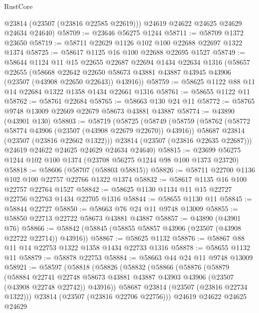 \begin{lexlean}{RustCore}
\begin{coremodule}
        @23814
        (@23507 (@23816 @22585 @22619)))
      @24619
      @24622
      @24625
      @24629
      @24634
      @24640)
@58709 := @23646 @56275 @1244
@58711 := @58709 @1372 @23650
@58719 := @58711 @22629 @1126 @102 @100 @22688 @22697 @1322 @1374
@58725 := @58617 @1125 @16 @100 @22688 @22695 @1527
@58749 := @58644
    @1124
    @11
    @15
    @22655
    @22687
    @22694
    @1434
    @22634
    @1316
    (@58657
      @22655
      (@58668
        @22642
        @22650
        @58673
        @43881
        @43887
        @43945
        @43906
        (@23507 (@43908 @22650 @22643))
        @43916))
@58759 := @58625 @1122 @88 @11 @14 @22684 @1322 @1358 @1434 @22661 @1316
@58761 := @58655 @1122 @11
@58762 := @58761 @22684
@58765 := @58663 @130 @24 @11
@58772 := @58765 @9748 @13009 @22669 @22679 @58673 @43881 @43887
@58774 := @43890 (@43901 @130)
@58803 := @58719
    (@58725
      (@58749
        (@58759
          (@58762 (@58772 @58774 @43906 (@23507 (@43908 @22679 @22670)) @43916))
          @58687
          @23814
          (@23507 (@23816 @22662 @1322)))
        @23814
        (@23507 (@23816 @22635 @22687)))
      @24619
      @24622
      @24625
      @24629
      @24634
      @24640)
@58815 := @23699 @56275 @1244 @102 @100 @1374 (@23708 @56275 @1244 @98 @100 @1373 @23720)
@58818 := @58606 (@58707 (@58803 @58815))
@58826 := @58711 @22700 @1136 @102 @100 @22757 @22766 @1322 @1374
@58832 := @58617 @1135 @16 @100 @22757 @22764 @1527
@58842 := @58625 @1130 @1134 @11 @15 @22727 @22756 @22763 @1434 @22705 @1316
@58844 := @58655 @1130 @11
@58845 := @58844 @22727
@58850 := @58663 @76 @24 @11 @9748 @13009
@58855 := @58850 @22713 @22722 @58673 @43881 @43887
@58857 := @43890 (@43901 @76)
@58866 := @58842 (@58845 (@58855 @58857 @43906 (@23507 (@43908 @22722 @22714)) @43916))
@58867 := @58625 @1132
@58876 := @58867 @88 @11 @14 @22753 @1322 @1358 @1434 @22733 @1316
@58878 := @58655 @1132 @11
@58879 := @58878 @22753
@58884 := @58663 @44 @24 @11 @9748 @13009
@58921 := @58597
    (@58818
      (@58826
        (@58832
          (@58866
            (@58876
              (@58879
                (@58884
                  @22741
                  @22748
                  @58673
                  @43881
                  @43887
                  @43903
                  @43906
                  (@23507 (@43908 @22748 @22742))
                  @43916))
              @58687
              @23814
              (@23507 (@23816 @22734 @1322)))
            @23814
            (@23507 (@23816 @22706 @22756)))
          @24619
          @24622
          @24625
          @24629

\end{coremodule}
\end{lexlean}
